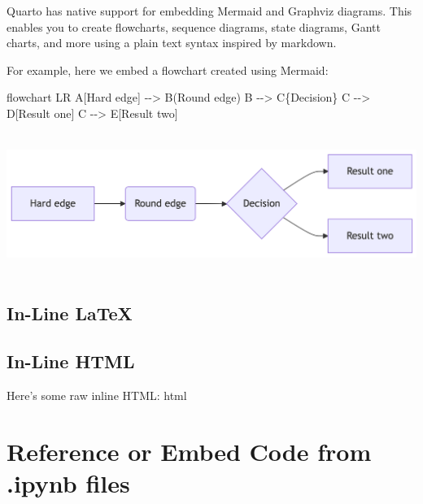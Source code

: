 \documentclass[
  11pt,
  letterpaper,
]{book}
\newenvironment{Shaded}{\begin{snugshade}}{\end{snugshade}}
\newcommand{\NormalTok}[1]{\textcolor[rgb]{0.00,0.23,0.31}{#1}}
\begin{document}

Quarto has native support for embedding Mermaid and Graphviz diagrams.
This enables you to create flowcharts, sequence diagrams, state
diagrams, Gantt charts, and more using a plain text syntax inspired by
markdown.

For example, here we embed a flowchart created using Mermaid:

\begin{Shaded}
\begin{Highlighting}[]
\NormalTok{flowchart LR}
\NormalTok{  A[Hard edge] {-}{-}\textgreater{} B(Round edge)}
\NormalTok{  B {-}{-}\textgreater{} C\{Decision\}}
\NormalTok{  C {-}{-}\textgreater{} D[Result one]}
\NormalTok{  C {-}{-}\textgreater{} E[Result two]}
\end{Highlighting}
\end{Shaded}

\includegraphics[width=6.88in,height=1.81in]{index_files/figure-latex/mermaid-figure-1.png}

\subsection*{In-Line LaTeX}\label{in-line-latex}

\renewcommand*{\labelitemi}{\textgreater}

\subsection*{In-Line HTML}\label{in-line-html}

Here's some raw inline HTML: html

\section*{Reference or Embed Code from .ipynb
files}\label{reference-or-embed-code-from-.ipynb-files}
\end{document}
